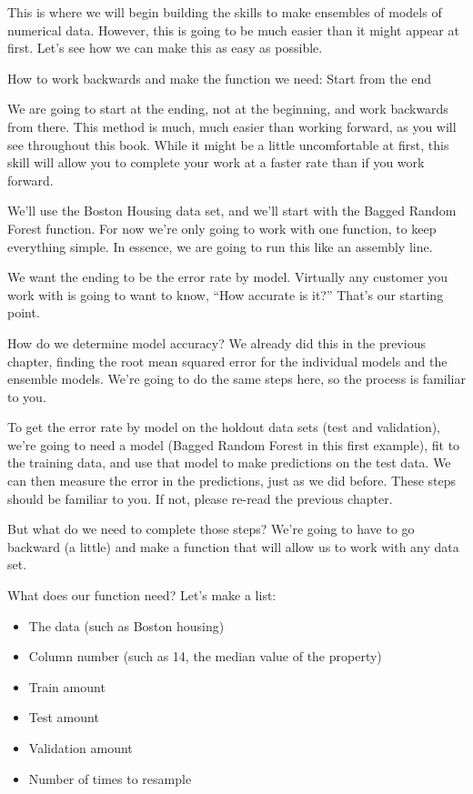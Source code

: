 \documentclass[
]{book}
\begin{document}
This is where we will begin building the skills to make ensembles of
models of numerical data. However, this is going to be much easier than
it might appear at first. Let's see how we can make this as easy as
possible.

How to work backwards and make the function we need: Start from the end

We are going to start at the ending, not at the beginning, and work
backwards from there. This method is much, much easier than working
forward, as you will see throughout this book. While it might be a
little uncomfortable at first, this skill will allow you to complete
your work at a faster rate than if you work forward.

We'll use the Boston Housing data set, and we'll start with the Bagged
Random Forest function. For now we're only going to work with one
function, to keep everything simple. In essence, we are going to run
this like an assembly line.

We want the ending to be the error rate by model. Virtually any customer
you work with is going to want to know, ``How accurate is it?'' That's our
starting point.

How do we determine model accuracy? We already did this in the previous
chapter, finding the root mean squared error for the individual models
and the ensemble models. We're going to do the same steps here, so the
process is familiar to you.

To get the error rate by model on the holdout data sets (test and
validation), we're going to need a model (Bagged Random Forest in this
first example), fit to the training data, and use that model to make
predictions on the test data. We can then measure the error in the
predictions, just as we did before. These steps should be familiar to
you. If not, please re-read the previous chapter.

But what do we need to complete those steps? We're going to have to go
backward (a little) and make a function that will allow us to work with
any data set.

What does our function need? Let's make a list:

\begin{itemize}
\item
  The data (such as Boston housing)
\item
  Column number (such as 14, the median value of the property)
\item
  Train amount
\item
  Test amount
\item
  Validation amount
\item
  Number of times to resample
\end{itemize}
\end{document}
